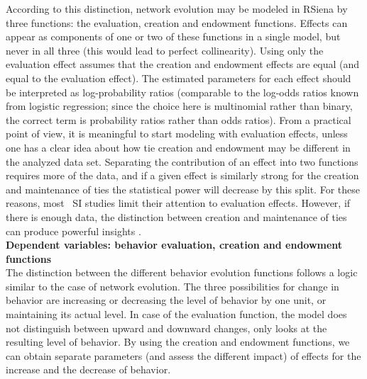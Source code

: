 \documentclass[a4paper,fleqn,11pt]{article}
\newcommand{\+}{\, + \,}
\newcommand{\RS}{{\sf \textsf{RSiena} }}
\begin{document}
According to this distinction, network evolution may be modeled
in \RS by three functions: the evaluation, creation and endowment functions.
Effects can appear as components of one or two of these functions in a single model,
but never in all three (this would lead to perfect collinearity).
Using only the evaluation effect assumes that the creation and endowment
effects are equal (and equal to the evaluation effect). The estimated
parameters for each effect should be interpreted as log-probability ratios
(comparable to the log-odds ratios known from logistic regression;
since the choice here is multinomial rather than binary, the correct term
is probability ratios rather than odds ratios).
From a practical point of view, it is meaningful to start modeling with
evaluation effects, unless one has a clear idea about how tie creation
and endowment may be different in the analyzed data set.
Separating the contribution of an effect into two functions requires
more of the data, and if a given effect is similarly strong for the
creation and maintenance of ties the statistical power will
decrease by this split.
For these reasons, most  \
SI studies limit their
attention to evaluation effects. However, if there is enough data,
the distinction between creation and maintenance of ties can
produce powerful insights \citep[e.g.,][]{Cheadle_etal2013}.\\

\noindent
\textbf{Dependent variables: behavior evaluation, creation and endowment functions}\\

The distinction between the different behavior evolution functions follows
a logic similar to the case of network evolution. The three possibilities
for change in behavior are increasing or decreasing the level of behavior
by one unit, or maintaining its actual level. In case of the evaluation
function, the model does not distinguish between upward and downward changes,
only looks at the resulting level of behavior. By using the creation and
endowment functions, we can obtain separate parameters (and assess the
different impact) of effects for the increase and the decrease of behavior.
\end{document}
